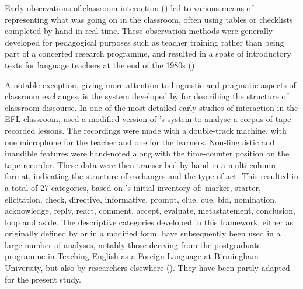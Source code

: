 \documentclass[output=paper,colorlinks,citecolor=brown,modfonts,nonflat]{../langscibook}
\begin{document}
Early observations of classroom interaction (\citealt{Flanders1970,Brown1975,Moskowitz1976,Bowers1980,AllenEtAl1983,UllmannGeva1982, UllmannGeva1984}) led to various means of representing what was going on in the classroom, often using tables or checklists completed by hand in real time. These observation methods were generally developed for pedagogical purposes such as teacher training rather than being part of a concerted research programme, and resulted in a spate of introductory texts for language teachers at the end of the 1980s (\citealt{Allwright1988,Chaudron1988,Lier1988,Nunan1989}).

A notable exception, giving more attention to linguistic and pragmatic aspects of classroom exchanges, is the system developed by \citet{SinclairCoulthard1975} for describing the structure of classroom discourse. In one of the most detailed early studies of interaction in the EFL classroom, \citet{Willis1981} used a modified version of \citeauthor{SinclairCoulthard1975}’s system to analyse a corpus of tape-recorded lessons. The recordings were made with a double-track machine, with one microphone for the teacher and one for the learners. Non-linguistic and inaudible features were hand-noted along with the time-counter position on the tape-recorder. These data were then transcribed by hand in a multi-column format, indicating the structure of exchanges and the type of act. This resulted in a total of 27 categories, based on \citeauthor{SinclairCoulthard1975}’s initial inventory of: marker, starter, elicitation, check, directive, informative, prompt, clue, cue, bid, nomination, acknowledge, reply, react, comment, accept, evaluate, metastatement, conclusion, loop and aside. The descriptive categories developed in this framework, either as originally defined by \citeauthor{SinclairCoulthard1975} or in a modified form, have subsequently been used in a large number of analyses, notably those deriving from the postgraduate programme in Teaching English as a Foreign Language at Birmingham University, but also by researchers elsewhere (\citealt{Chaudron1977, GrandcolasSoulé-Susbielles1986, Chapelle1990}). They have been partly adapted for the present study.
\end{document}

